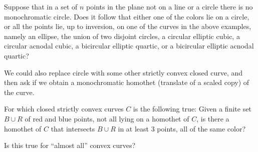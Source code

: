 \documentclass[a4paper,11pt,leqno]{article}
\begin{document}
\begin{question}
    Suppose that in a set of $n$ points in the plane not on a line or a circle there is no monochromatic circle.
    Does it follow that either one of the colors lie on a circle, or all the points lie, up to inversion, on one of the curves in the above examples, namely
    an ellipse, the union of two disjoint circles, a circular elliptic cubic, a circular acnodal cubic, a bicircular elliptic quartic, or a bicircular elliptic acnodal quartic?
\end{question}
We could also replace circle with some other strictly convex closed curve, and then ask if we obtain a monochromatic homothet (translate of a scaled copy) of the curve.
\begin{question}
For which closed strictly convex curves $C$ is the following true:
Given a finite set $B\cup R$ of red and blue points, not all lying on a homothet of $C$, is there a homothet of $C$ that intersects $B\cup R$ in at least $3$ points, all of the same color? 

Is this true for ``almost all'' convex curves?
\end{question}
\end{document}
